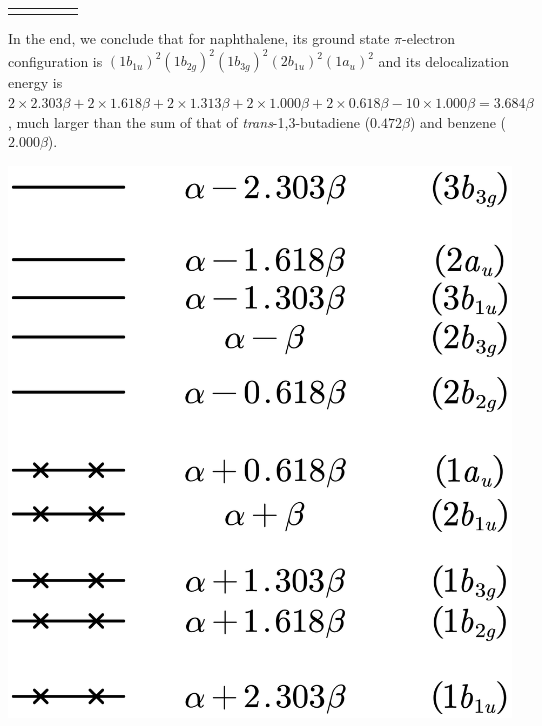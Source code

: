 \begin{center}
\begin{tabular}{ccccc}
\begin{minipage}[t]{0.175\linewidth}
			\captionof*{figure}{$\varepsilon = \alpha - 2.303\beta$}
			\end{minipage}
		\end{tabular}				
		\label{fig:phase_diagram_5}
		\end{center}
		
		In the end, we conclude that for naphthalene, its ground state $\pi$-electron configuration is $(1b_{1u})^2 (1b_{2g})^2 (1b_{3g})^2 (2b_{1u})^2 (1a_u)^2$ and its delocalization energy is $2 \times 2.303 \beta + 2 \times 1.618 \beta + 2 \times 1.313 \beta + 2 \times 1.000 \beta + 2 \times 0.618 \beta - 10 \times 1.000 \beta = 3.684 \beta$, much larger than the sum of that of {\it trans}-1,3-butadiene ($0.472\beta$) and benzene ($2.000\beta$). 
		
		\begin{center}
		\includegraphics[scale=1.0]{./structures/exercise_1/naphthalene/998.png}
		\end{center}